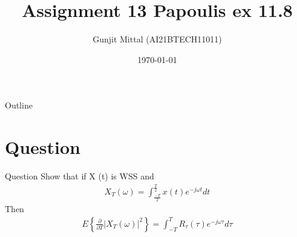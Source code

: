 \documentclass{beamer}
\title{Assignment 13 Papoulis ex 11.8}
\author{Gunjit Mittal (AI21BTECH11011)}
\date{\today}
\providecommand{\cbrak}[1]{\ensuremath{\left\{#1\right\}}}
\theoremstyle{remark}
\numberwithin{equation}{section}
\numberwithin{figure}{section}
\numberwithin{table}{section}
\begin{document}
 
\begin{frame}
  \titlepage{}
\end{frame} 
\logo{}
\begin{frame}{Outline} 
  \tableofcontents
\end{frame}
\section{Question} 
\begin{frame}{Question}
    Show that if X (t) is WSS and 
    \begin{align*}
        X_T(\omega) = \int^{\frac{T}{2}}_{\frac{-T}{2}} x(t)e^{-j\omega t} dt
    \end{align*}
         Then
    \begin{align*}
         E\cbrak{\frac{\partial}{\partial T}{|X_T(\omega)|}^2} = \int_{-T}^T R_{\tau}(\tau)e^{-j\omega\tau} d\tau
    \end{align*}
\end{frame}
\end{document}
